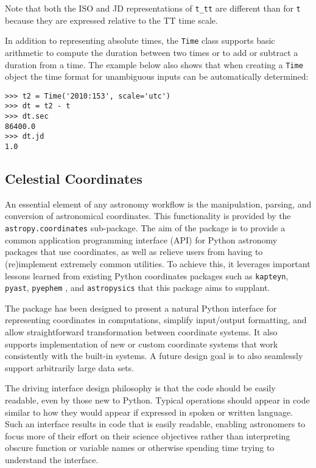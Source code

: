 \documentclass[traditabstract]{aa}
\begin{document}
Note that both the ISO and JD representations of \verb|t_tt| are different than for
\verb|t| because they are expressed relative to the TT time scale.

In addition to representing absolute times, the \verb|Time| class supports
basic arithmetic to compute the duration between two times or to add or
subtract a duration from a time.  The example below also shows that when
creating a \verb|Time| object the time format for unambiguous inputs can be
automatically determined:

\begin{verbatim}
>>> t2 = Time('2010:153', scale='utc')
>>> dt = t2 - t
>>> dt.sec
86400.0
>>> dt.jd
1.0
\end{verbatim}

\subsection{Celestial Coordinates}



An essential element of any astronomy workflow 
is the manipulation, parsing, and conversion of astronomical coordinates.
This functionality is provided by the \texttt{astropy.coordinates} sub-package.
The aim of the package is to provide a common application programming interface (API)
for Python astronomy packages that use coordinates, as well as
relieve users from having to (re)implement extremely common utilities.
To achieve this, it leverages important lessons learned from existing
Python coordinates packages such as \texttt{kapteyn}, \texttt{pyast},
\texttt{pyephem} \citep{pyephem}, and \texttt{astropysics}
\citep{astropysics} that this package aims to supplant.

The package has been designed to present a natural Python
interface for representing coordinates in computations, simplify
input/output formatting, and allow straightforward transformation
between coordinate systems. 
It also supports implementation of new or custom
coordinate systems that work consistently with the built-in systems.
A future design goal is to also seamlessly
support arbitrarily large data sets.

The driving interface design philosophy is that the code should
be easily readable, even by those new to Python. Typical operations should
appear in code similar to how they would appear if expressed in spoken or 
written language. Such an interface results in code that is easily readable,
enabling astronomers to focus more of their effort on their science objectives
rather than interpreting obscure function or variable names or otherwise 
spending time trying to understand the interface.
\end{document}
